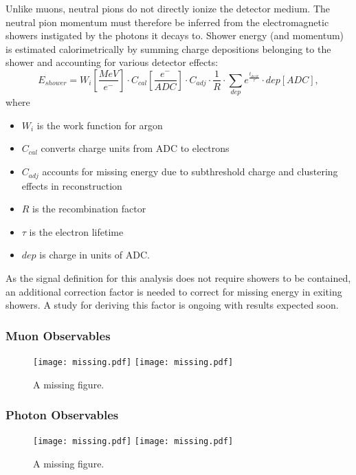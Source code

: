 \documentclass[../main.tex]{subfiles}
\begin{document}
Unlike muons, neutral pions do not directly ionize the detector medium.  The neutral pion momentum must therefore be inferred from the electromagnetic showers instigated by the photons it decays to.  Shower energy (and momentum) is estimated calorimetrically by summing charge depositions belonging to the shower and accounting for various detector effects:
\begin{equation}
    E_{shower} = W_{i} [\frac{MeV}{e^{-}}] \cdot C_{cal} [\frac{e^{-}}{ADC}] \cdot C_{adj} \cdot \frac{1}{R} \cdot \sum_{dep} e^{\frac{t_{drift}}{\tau}} \cdot dep [ADC],
\end{equation}
where
\begin{itemize}[label=]
    \setlength\itemsep{0.1ex}
    \item $W_{i}$ is the work function for argon
    \item $C_{cal}$ converts charge units from ADC to electrons
    \item $C_{adj}$ accounts for missing energy due to subthreshold charge and clustering effects in reconstruction
    \item $R$ is the recombination factor
    \item $\tau$ is the electron lifetime
    \item $dep$ is charge in units of ADC.
\end{itemize}
As the signal definition for this analysis does not require showers to be contained, an additional correction factor is needed to correct for missing energy in exiting showers.  A study for deriving this factor is ongoing with results expected soon.

\subsubsection{Muon Observables}
\begin{figure}[H]
    \center
    \texttt{[image: missing.pdf]}
    \texttt{[image: missing.pdf]}
    \caption[text]{A missing figure.}
    \label{fig:muon_obs}
\end{figure}

\subsubsection{Photon Observables}
\begin{figure}[H]
    \center
    \texttt{[image: missing.pdf]}
    \texttt{[image: missing.pdf]}
    \caption[text]{A missing figure.}
    \label{fig:ph_obs0}
\end{figure}
\end{document}
